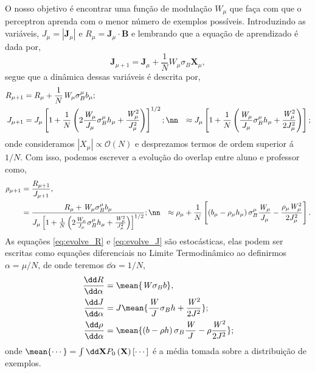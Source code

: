 O nosso objetivo é encontrar uma função de modulação $W_\mu$
que faça com que o perceptron aprenda com o menor número de exemplos
possíveis. Introduzindo as variáveis, $J_\mu = \left|\mathbf{J}_\mu\right|$
e $R_\mu = \mathbf{J}_\mu\cdot\mathbf{B}$ e lembrando que a equação de
aprendizado é dada por,
\begin{equation}
  \mathbf{J}_{\mu+1} = 
  \mathbf{J}_\mu  + \frac{1}{N}\mathit{W}_\mu\sigma_B\mathbf{X}_\mu,
  \label{eq:Jmu}
\end{equation}
segue que a dinâmica dessas variáveis é descrita por,
\begin{align}
    R_{\mu +1} &=   
    R_\mu  + \frac{1}{N}\mathit{W}_\mu\sigma_B^\mu b_\mu  
    \label{eq:evolve_R}; \\
    J_{\mu+1} &=  
    J_\mu \left[ 1 + \frac{1}{N} 
        \left( 2 \frac{\mathit{W}_\mu}{J_\mu} \sigma_B^\mu h_\mu 
    + \frac{\mathit{W}_\mu^2}{J_\mu^2} \right) \right]^{1/2}; \nn 
    &\approx  J_\mu \left[ 1 + \frac{1}{N}
    \left( \frac{\mathit{W}_\mu}{J_\mu} \sigma_B^\mu h_\mu + 
\frac{\mathit{W}_\mu^2}{2J_\mu^2} \right) \right] 
\label{eq:evolve_J};
\end{align}
onde consideramos $\left|X_\mu\right| \propto
\mathcal{O}\left(N\right) $ e desprezamos termos de ordem superior á $1/N$.
Com isso, podemos escrever a evolução do overlap entre aluno e
professor como,
\begin{align}
    \rho_{\mu+1} &= \frac{ R_{\mu+1} }{ J_{\mu+1} }, \nonumber\\ 
                 &=  \frac{R_\mu  + \mathit{W}_\mu\sigma_B^\mu b_\mu}
    {{J_\mu \left[ 1 + \frac{1}{N}
                \left( 2 \frac{\mathit{W}_\mu}{J_\mu} \sigma_B^\mu h_\mu 
    + \frac{\mathit{W}_\mu^2}{J_\mu^2} \right) \right]^{1/2}} };\nn 
    &\approx \rho_\mu + \frac{1}{N}\left[ \left( 
    b_\mu -\rho_\mu h_\mu \right)\sigma_B^\mu\frac{\mathit{W}_\mu}{J_\mu} 
- \frac{\rho_\mu \mathit{W}_\mu^2}{2J_\mu^2} \right].
\label{eq:evolve_rho}
\end{align}
As equações \eqref{eq:evolve_R} e \eqref{eq:evolve_J} são estocásticas,
elas  podem ser escritas como equações diferenciais no Limite Termodinâmico
ao definirmos $\alpha = \mu/N$, de onde teremos $\dd \alpha = 1/N$,
\begin{align}
  \frac{\dd R}{\dd \alpha} &=  \mean{\mathit{W}\sigma_B b},  \label{eq:dif_R}\\
  \frac{\dd J}{\dd \alpha} &= J\mean{ \frac{\mathit{W}}{J} \sigma_B h 
    + \frac{\mathit{W}^2}{2J^2} }; \label{eq:dif_J}\\    
  \frac{\dd \rho}{\dd \alpha} &= 
    \mean{ \left( b -\rho h \right)\sigma_B\frac{\mathit{W}}{J} 
    - \rho \frac{\mathit{W}^2}{2J^2} }; \label{eq:dif_rho}
\end{align}
onde $\mean{\cdots} = \int \dd\mathbf{X} P_0 \left( \mathbf{X}
\right)\left[\cdots\right] $ é a média tomada sobre a distribuição
de exemplos.

